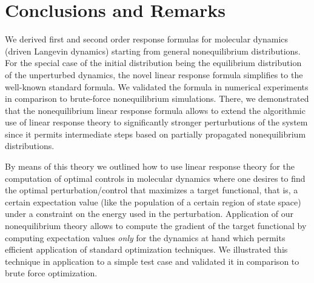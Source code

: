 \documentclass[]{tMPH2e}
\begin{document}
 





\section{Conclusions and Remarks}

We derived  first and second order response formulas for molecular dynamics (driven Langevin dynamics) starting from general nonequilibrium distributions. For the special case of the initial distribution being the equilibrium distribution of the unperturbed dynamics, the novel linear response formula simplifies to the well-known standard formula. We validated the  formula in numerical experiments in comparison to brute-force nonequilibrium simulations. There, we demonstrated that the nonequilibrium linear response formula allows to extend the algorithmic use of linear response theory to significantly stronger perturbutions of the system since it permits intermediate steps based on partially propagated nonequilibrium distributions. 

By means of this theory we outlined how to use linear response theory for the computation of optimal controls in molecular dynamics where one desires to find the optimal perturbation/control that maximizes a target functional, that is, a certain expectation value (like the population of a certain region of state space) under a constraint on the energy used in the perturbation. Application of our nonequilibrium theory allows to compute the gradient of the target functional by computing expectation values \emph{only} for the dynamics at hand which permits efficient application of standard optimization techniques. We illustrated this technique in application to a simple test case and validated it in comparison to brute force optimization.  













\end{document}
